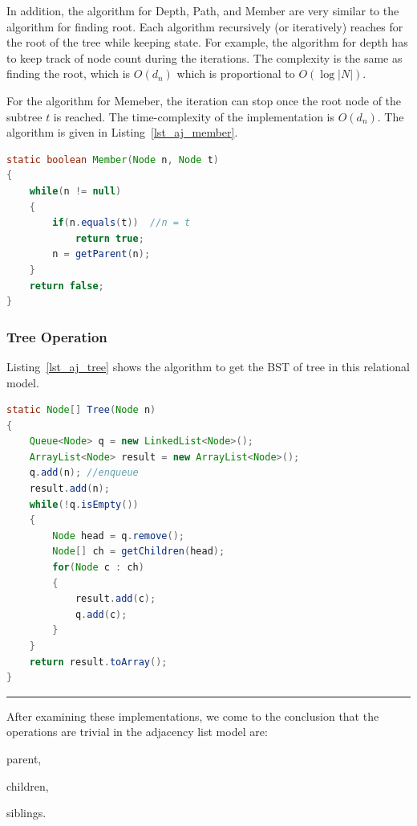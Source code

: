 In addition, the algorithm for Depth, Path, and Member are very similar to the algorithm for finding root. Each algorithm recursively (or iteratively) reaches for the root of the tree while keeping state. For example, the algorithm for depth has to keep track of node count during the iterations. The complexity is the same as finding the root, which is $O(d_n)$ which is proportional to $O(\log |N|)$.

For the algorithm for Memeber, the iteration can stop once the root node of the subtree $t$ is reached. The time-complexity of the implementation is $O(d_n)$. The algorithm is given in Listing~\ref{lst_aj_member}.

\begin{lstlisting}[language=java, style=java, caption=Member, label=lst_aj_member]
static boolean Member(Node n, Node t)
{
    while(n != null)
    {
        if(n.equals(t))  //n = t
            return true;
        n = getParent(n);
    }
    return false;
}
\end{lstlisting}



\subsubsection{Tree Operation}

Listing~\ref{lst_aj_tree} shows the algorithm to get the BST of tree in this relational model.

\begin{lstlisting}[language=java, style=java, caption=Tree via Adjacency List, label=lst_aj_tree]
static Node[] Tree(Node n)
{
    Queue<Node> q = new LinkedList<Node>();
    ArrayList<Node> result = new ArrayList<Node>();
    q.add(n); //enqueue
    result.add(n);
    while(!q.isEmpty())
    {
        Node head = q.remove();
        Node[] ch = getChildren(head);
        for(Node c : ch)
        {
            result.add(c);
            q.add(c);
        }
    }
    return result.toArray();
}
\end{lstlisting}

\rule{2cm}{0.5pt}

After examining these implementations, we come to the conclusion that the operations are trivial in the adjacency list model are:
\begin{inparaenum}[\itshape 1)]
\item parent,
\item children,
\item siblings.
\end{inparaenum}

